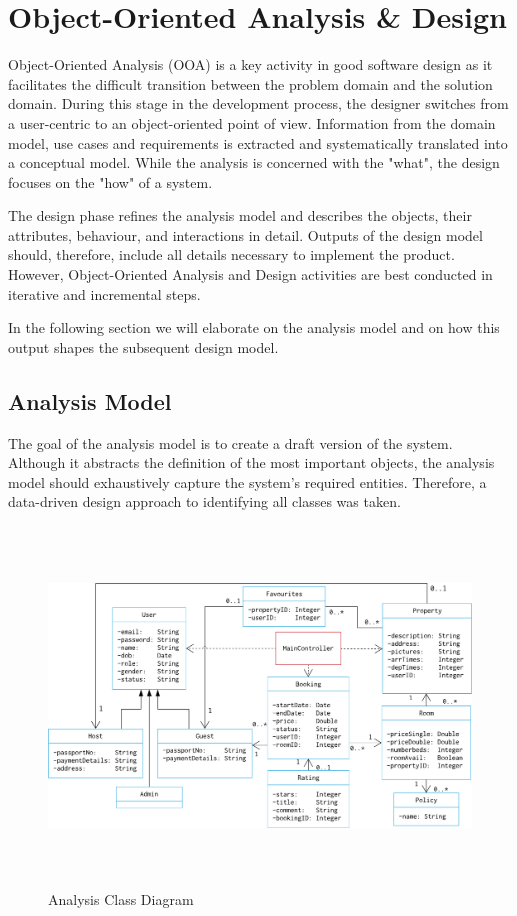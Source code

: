 \chapter{Object-Oriented Analysis \& Design} \label{chapter:chapter4}

Object-Oriented Analysis (OOA) is a key activity in good software design as it facilitates the difficult transition between the problem domain and the solution domain. During this stage in the development process, the designer switches from a user-centric to an object-oriented point of view. Information from the domain model, use cases and requirements is extracted and systematically translated into a conceptual model. While the analysis is concerned with the "what", the design focuses on the "how" of a system.

The design phase refines the analysis model and describes the objects, their attributes, behaviour, and interactions in detail. Outputs of the design model should, therefore, include all details necessary to implement the product. However, Object-Oriented Analysis and Design activities are best conducted in iterative and incremental steps. 

In the following section we will elaborate on the analysis model and on how this output shapes the subsequent design model.

\section{Analysis Model}

The goal of the analysis model is to create a draft version of the system. Although it abstracts the definition of the most important objects, the analysis model should exhaustively capture the system's required entities. Therefore, a data-driven design approach to identifying all classes was taken.

\begin{figure}[H]
    \centering
    \includegraphics[height=9.5cm]{img/analysis_diagram.png}
    \caption{Analysis Class Diagram}
    \label{analysis_diagram}
\end{figure}

